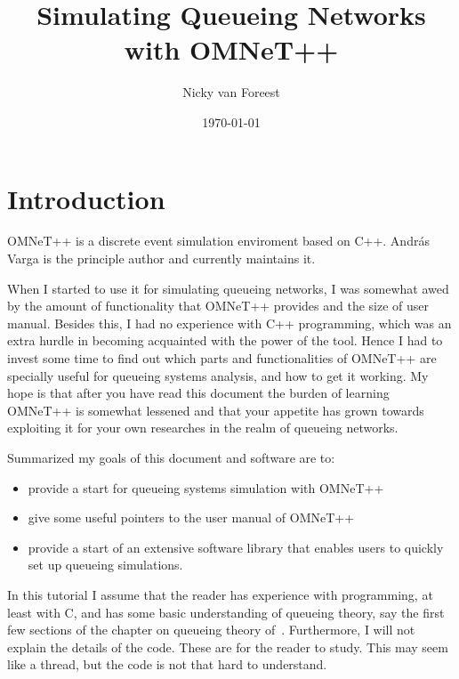 \documentclass[a4paper]{article}
\date{\today}
\author{Nicky van Foreest}
\title{Simulating Queueing Networks with OMNeT++}
\begin{document}
\maketitle {}
\tableofcontents

\section{Introduction}
\label{sec:introduction}
OMNeT++ is a discrete event simulation enviroment based on C++. Andr{\'a}s
Varga is the principle author and  currently maintains it.

 When I
started to use it for simulating queueing networks, I was somewhat
awed by the amount of functionality that OMNeT++ provides and the size
of user manual. Besides this, I had no experience with C++
programming, which was an extra hurdle in becoming acquainted with the
power of the tool. Hence I had to invest some time to find out which
parts and functionalities of OMNeT++ are specially useful for queueing
systems analysis, and how to get it working. My hope is that after you
have read this document the burden of learning OMNeT++ is somewhat
lessened and that your appetite has grown towards exploiting it for
your own researches in the realm of queueing networks.

Summarized my goals of this document and software are to: 
\begin{itemize}
\item provide a start for queueing systems simulation with OMNeT++ 
\item give some useful pointers to the user manual of OMNeT++
\item provide a start of an extensive software library that enables
  users to quickly set up queueing simulations.
\end{itemize}

In this tutorial I assume that the reader has experience with
programming, at least with C, and has some basic understanding of
queueing theory, say the first few sections of the chapter on queueing
theory of~\cite{Ross93}.  Furthermore, I will not explain the details
of the code. These are  for the reader to study. This may seem like a
thread, but the code is not that hard to understand.
\end{document}
